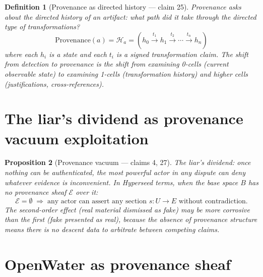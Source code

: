 \documentclass[11pt,a4paper]{article}
\newtheorem{definition}{Definition}[section]
\newtheorem{proposition}[definition]{Proposition}
\begin{document}
\begin{definition}[Provenance as directed history --- claim 25]
\label{def:provenance}
\emph{Provenance} asks about the directed history of an artifact: what
path did it take through the directed type of transformations?
\[
  \text{Provenance}(a) = \mathcal{H}_a = (h_0 \xrightarrow{t_1} h_1
  \xrightarrow{t_2} \cdots \xrightarrow{t_n} h_n)
\]
where each $h_i$ is a state and each $t_i$ is a signed transformation
claim. The shift from detection to provenance is the shift from
examining 0-cells (current observable state) to examining 1-cells
(transformation history) and higher cells (justifications, cross-references).
\end{definition}

\section{The liar's dividend as provenance vacuum exploitation}
\label{sec:liar}

\begin{proposition}[Provenance vacuum --- claims 4, 27]
\label{prop:vacuum}
The \emph{liar's dividend}: once nothing can be authenticated, the most
powerful actor in any dispute can deny whatever evidence is inconvenient.
In Hyperseed terms, when the base space $B$ has no provenance sheaf
$\mathcal{E}$ over it:
\[
  \mathcal{E} = \emptyset \;\Rightarrow\;
  \text{any actor can assert any section } s : U \to E
  \text{ without contradiction}.
\]
The second-order effect (real material dismissed as fake) may be more
corrosive than the first (fake presented as real), because the absence
of provenance structure means there is no descent data to arbitrate
between competing claims.
\end{proposition}

\section{OpenWater as provenance sheaf}
\label{sec:openwater}
\end{document}
